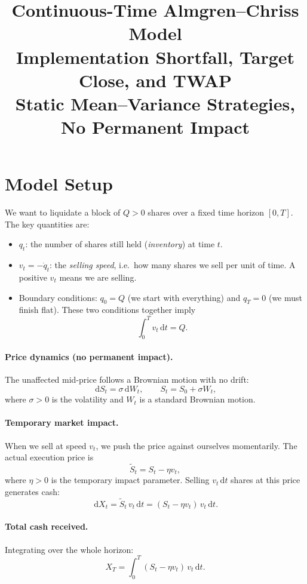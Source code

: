 \documentclass[12pt, a4paper]{article}
\title{%
  \textbf{\textcolor{accentblue}{Continuous-Time Almgren--Chriss Model}}\\[4pt]
  \large Implementation Shortfall, Target Close, and TWAP\\
  \normalsize Static Mean--Variance Strategies, No Permanent Impact\\[6pt]
}
\author{}
\date{}
\newcommand{\dd}{\,\mathrm{d}}
\begin{document}
\maketitle
\thispagestyle{empty}

\section{Model Setup}

We want to liquidate a block of $Q > 0$ shares over a fixed time horizon $[0,T]$.
The key quantities are:

\begin{itemize}[leftmargin=1.5em]
  \item $q_t$: the number of shares still held (\emph{inventory}) at time $t$.
  \item $v_t = -\dot q_t$: the \emph{selling speed}, i.e.\ how many shares we sell per unit of time.
    A positive $v_t$ means we are selling.
  \item Boundary conditions: $q_0 = Q$ (we start with everything) and $q_T = 0$ (we must finish flat). These two conditions together imply
        \[
          \int_0^T v_t \dd t = Q.
        \]
\end{itemize}

\paragraph{Price dynamics (no permanent impact).}
The unaffected mid-price follows a Brownian motion with no drift:
\[
  \dd S_t = \sigma \dd W_t, \qquad S_t = S_0 + \sigma W_t,
\]
where $\sigma > 0$ is the volatility and $W_t$ is a standard Brownian motion.

\paragraph{Temporary market impact.}
When we sell at speed $v_t$, we push the price against ourselves momentarily.
The actual execution price is
\[
  \tilde S_t = S_t - \eta v_t,
\]
where $\eta > 0$ is the temporary impact parameter.
Selling $v_t \dd t$ shares at this price generates cash:
\[
  \dd X_t = \tilde S_t \, v_t \dd t = (S_t - \eta v_t)\,v_t \dd t.
\]

\paragraph{Total cash received.}
Integrating over the whole horizon:
\[
  X_T = \int_0^T (S_t - \eta v_t)\,v_t \dd t.
\]
\end{document}
